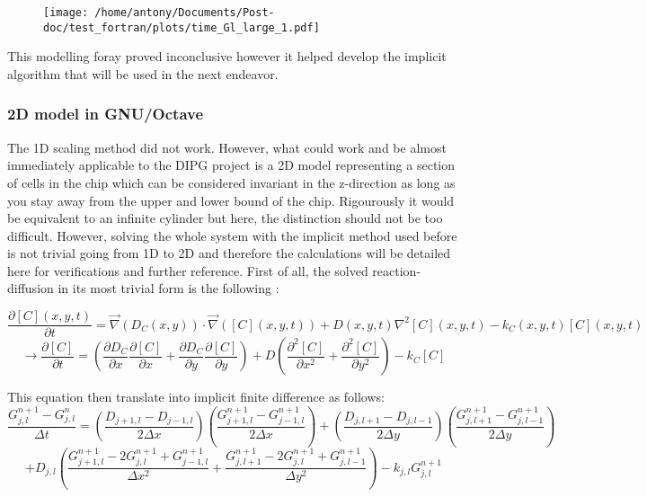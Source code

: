 \documentclass[11pt,a4paper]{article}
\begin{document}
\begin{figure}[ht!]
	\centering
	\texttt{[image: /home/antony/Documents/Post-doc/test\_fortran/plots/time\_Gl\_large\_1.pdf]}
	\caption{\label{t_1D}}
\end{figure}

This modelling foray proved inconclusive however it helped develop the implicit algorithm that will be used in the next endeavor.

\subsubsection{2D model in GNU/Octave}
The 1D scaling method did not work. However, what could work and be almost immediately applicable to the DIPG project is a 2D model representing a section of cells in the chip which can be considered invariant in the z-direction as long as you stay away from the upper and lower bound of the chip. Rigourously it would be equivalent to an infinite cylinder but here, the distinction should not be too difficult. However, solving the whole system with the implicit method used before is not trivial going from  1D to 2D and therefore the calculations will be detailed here for verifications and further reference. First of all, the solved reaction-diffusion in its most trivial form is the following : 

\[ \frac{\partial [C](x,y,t)}{\partial t} = \overrightarrow{\nabla}(D_C(x,y)) \cdot \overrightarrow{\nabla}( [C](x,y,t)) + D(x,y,t) \nabla^2 [C](x,y,t) -k_C(x,y,t)[C](x,y,t) \] 
\[\rightarrow \frac{\partial [C]}{\partial t} = (\frac{\partial D_C}{\partial x}\frac{\partial [C]}{\partial x} + \frac{\partial D_C}{\partial y}\frac{\partial [C]}{\partial y}) + D (\frac{\partial^2 [C]}{\partial x^2} + \frac{\partial^2 [C]}{\partial y^2}) -k_C[C] \] 

This equation then translate into implicit finite difference as follows: 
\[\frac{G^{n+1}_{j,l} - G^{n}_{j,l}}{\Delta t} = (\frac{D_{j+1,l} - D_{j-1,l}}{2 \Delta x})(\frac{G^{n+1}_{j+1,l} - G^{n+1}_{j-1,l}}{2 \Delta x}) + (\frac{D_{j,l+1} - D_{j,l-1}}{2 \Delta y}) ( \frac{G^{n+1}_{j,l+1} - G^{n+1}_{j,l-1}}{2 \Delta y})\] \[ + D_{j,l}(\frac{G^{n+1}_{j+1,l} - 2G^{n+1}_{j,l} + G^{n+1}_{j-1,l}}{\Delta x^2} + \frac{G^{n+1}_{j,l+1} - 2G^{n+1}_{j,l} + G^{n+1}_{j,l-1}}{\Delta y^2}) - k_{j,l} G^{n+1}_{j,l}\]
\end{document}
